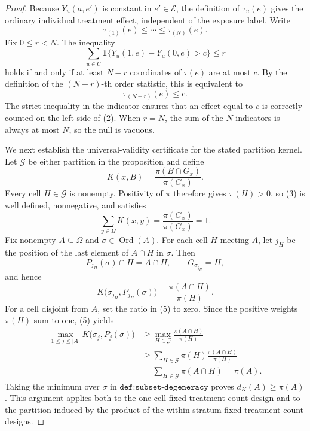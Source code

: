 \documentclass{article}
\begin{document}
\begin{proof}
Because \(Y_u(a,e')\) is constant in \(e'\in\mathcal E\), the definition of \(\tau_u(e)\) gives the ordinary individual treatment effect, independent of the exposure label.  Write
\[
 \tau_{(1)}(e)\leq\cdots\leq\tau_{(N)}(e).
\]
Fix \(0\leq r<N\).  The inequality
\[
 \sum_{u\in U}\mathbf 1\{Y_u(1,e)-Y_u(0,e)>c\}\leq r
\tag{1}
\]
holds if and only if at least \(N-r\) coordinates of \(\tau(e)\) are at most \(c\).  By the definition of the \((N-r)\)-th order statistic, this is equivalent to
\[
 \tau_{(N-r)}(e)\leq c.
\tag{2}
\]
The strict inequality in the indicator ensures that an effect equal to \(c\) is correctly counted on the left side of (2).  When \(r=N\), the sum of the \(N\) indicators is always at most \(N\), so the null is vacuous.

We next establish the universal-validity certificate for the stated partition kernel.  Let \(\mathcal G\) be either partition in the proposition and define
\[
 K(x,B)=\frac{\pi(B\cap G_x)}{\pi(G_x)}.
\tag{3}
\]
Every cell \(H\in\mathcal G\) is nonempty.  Positivity of \(\pi\) therefore gives \(\pi(H)>0\), so (3) is well defined, nonnegative, and satisfies
\[
 \sum_{y\in\Omega}K(x,y)=\frac{\pi(G_x)}{\pi(G_x)}=1.
\tag{4}
\]
Fix nonempty \(A\subseteq\Omega\) and \(\sigma\in\operatorname{Ord}(A)\).  For each cell \(H\) meeting \(A\), let \(j_H\) be the position of the last element of \(A\cap H\) in \(\sigma\).  Then
\[
 P_{j_H}(\sigma)\cap H=A\cap H,
 \qquad G_{\sigma_{j_H}}=H,
\]
and hence
\[
 K\bigl(\sigma_{j_H},P_{j_H}(\sigma)\bigr)
 =\frac{\pi(A\cap H)}{\pi(H)}.
\tag{5}
\]
For a cell disjoint from \(A\), set the ratio in (5) to zero.  Since the positive weights \(\pi(H)\) sum to one, (5) yields
\[
 \begin{aligned}
 \max_{1\leq j\leq |A|}K\bigl(\sigma_j,P_j(\sigma)\bigr)
 &\geq \max_{H\in\mathcal G}\frac{\pi(A\cap H)}{\pi(H)}\\
 &\geq \sum_{H\in\mathcal G}\pi(H)
       \frac{\pi(A\cap H)}{\pi(H)}\\
 &=\sum_{H\in\mathcal G}\pi(A\cap H)
 =\pi(A).
 \end{aligned}
\tag{6}
\]
Taking the minimum over \(\sigma\) in \(\texttt{def:subset-degeneracy}\) proves \(d_K(A)\geq\pi(A)\).  This argument applies both to the one-cell fixed-treatment-count design and to the partition induced by the product of the within-stratum fixed-treatment-count designs.


\end{proof}
\end{document}
